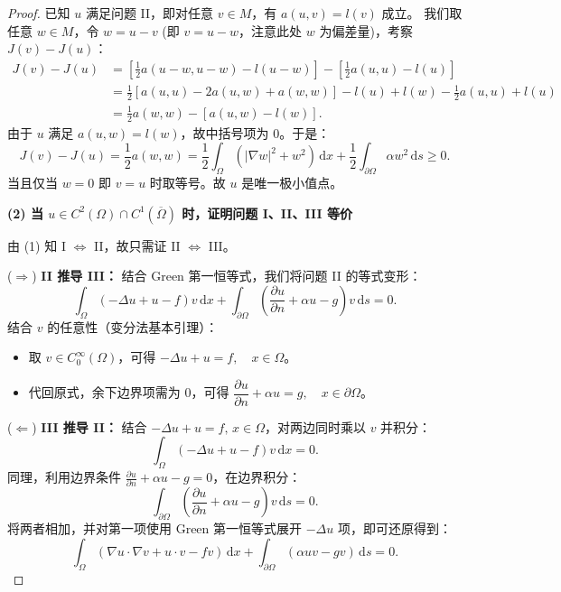 \documentclass[12pt,a4paper]{ctexart}
\begin{document}
\begin{proof}
		已知 $u$ 满足问题 II，即对任意 $v \in M$，有 $a(u,v) = l(v)$ 成立。
		我们取任意 $w \in M$，令 $w = u - v$ (即 $v = u - w$，注意此处 $w$ 为偏差量)，考察 $J(v) - J(u)$：
		\[
		\begin{aligned}
			J(v) - J(u) &= \left[ \frac{1}{2}a(u-w, u-w) - l(u-w) \right] - \left[ \frac{1}{2}a(u,u) - l(u) \right] \\
			&= \frac{1}{2}[a(u,u) - 2a(u,w) + a(w,w)] - l(u) + l(w) - \frac{1}{2}a(u,u) + l(u) \\
			&= \frac{1}{2}a(w,w) - [a(u,w) - l(w)].
		\end{aligned}
		\]
		由于 $u$ 满足 $a(u,w) = l(w)$，故中括号项为 0。于是：
		\[
		J(v) - J(u) = \frac{1}{2}a(w,w) = \frac{1}{2}\int_{\Omega} (|\nabla w|^2 + w^2) \,\mathrm{d}x + \frac{1}{2}\int_{\partial\Omega} \alpha w^2 \,\mathrm{d}s \geqslant 0.
		\]
		当且仅当 $w=0$ 即 $v=u$ 时取等号。故 $u$ 是唯一极小值点。
		
		\vspace{1em}
		\textbf{(2) 当 $u \in C^2(\Omega) \cap C^1(\overline{\Omega})$ 时，证明问题 I、II、III 等价}
		
		由 (1) 知 I $\Leftrightarrow$ II，故只需证 II $\Leftrightarrow$ III。
		
		\noindent ($\Longrightarrow$) \textbf{II 推导 III：}
		结合 Green 第一恒等式，我们将问题 II 的等式变形：
		\[
		\int_{\Omega} (-\Delta u + u - f)v \,\mathrm{d}x + \int_{\partial\Omega} \left( \frac{\partial u}{\partial n} + \alpha u - g \right)v \,\mathrm{d}s = 0.
		\]
		结合 $v$ 的任意性（变分法基本引理）：
		\begin{itemize}
			\item 取 $v \in C_0^{\infty}(\Omega)$，可得 $-\Delta u + u = f, \quad x \in \Omega$。
			\item 代回原式，余下边界项需为 0，可得 $\dfrac{\partial u}{\partial n} + \alpha u = g, \quad x \in \partial\Omega$。
		\end{itemize}
		
		\noindent ($\Longleftarrow$) \textbf{III 推导 II：}
		结合 $-\Delta u + u = f, \, x \in \Omega$，对两边同时乘以 $v$ 并积分：
		\[
		\int_{\Omega} (-\Delta u + u - f)v \,\mathrm{d}x = 0.
		\]
		同理，利用边界条件 $\frac{\partial u}{\partial n} + \alpha u - g = 0$，在边界积分：
		\[
		\int_{\partial\Omega} \left( \frac{\partial u}{\partial n} + \alpha u - g \right)v \,\mathrm{d}s = 0.
		\]
		将两者相加，并对第一项使用 Green 第一恒等式展开 $-\Delta u$ 项，即可还原得到：
		\[
		\int_{\Omega} (\nabla u \cdot \nabla v + u \cdot v - fv) \,\mathrm{d}x + \int_{\partial\Omega} (\alpha uv - gv) \,\mathrm{d}s = 0.
		\]
	\end{proof}
	
\end{document}
